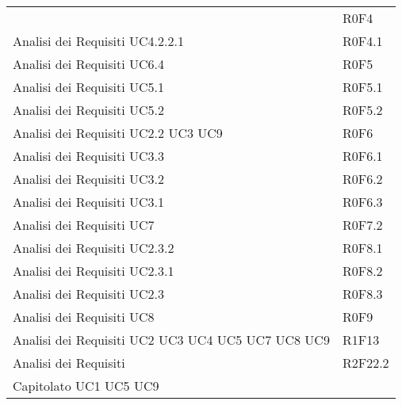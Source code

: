 \documentclass[../AnalisiDeiRequisiti.tex]{subfiles}
\begin{document}
\begin{longtable}{p{5cm}!{\VRule[1pt]}p{5cm}}
		& R0F4 \\
		Analisi dei Requisiti \newline UC4.2.2.1
		& R0F4.1 \\
		Analisi dei Requisiti \newline UC6.4
		& R0F5 \\
		Analisi dei Requisiti \newline UC5.1
		& R0F5.1 \\
		Analisi dei Requisiti \newline UC5.2
		& R0F5.2 \\
		Analisi dei Requisiti \newline UC2.2
		\newline UC3
		\newline UC9
		& R0F6 \\
		Analisi dei Requisiti \newline UC3.3
		& R0F6.1 \\
		Analisi dei Requisiti \newline UC3.2
		& R0F6.2 \\
		Analisi dei Requisiti \newline UC3.1
		& R0F6.3 \\
		Analisi dei Requisiti \newline UC7
		& R0F7.2 \\
		Analisi dei Requisiti \newline UC2.3.2
		& R0F8.1 \\
		Analisi dei Requisiti \newline UC2.3.1
		& R0F8.2 \\
		Analisi dei Requisiti \newline UC2.3
		& R0F8.3 \\
		Analisi dei Requisiti \newline UC8
		& R0F9 \\
		Analisi dei Requisiti \newline UC2
		\newline UC3
		\newline UC4
		\newline UC5
		\newline UC7
		\newline UC8
		\newline UC9
		& R1F13 \\
		Analisi dei Requisiti & R2F22.2 \\
		Capitolato \newline UC1
		\newline UC5
		\newline UC9

\end{longtable}
\end{document}
